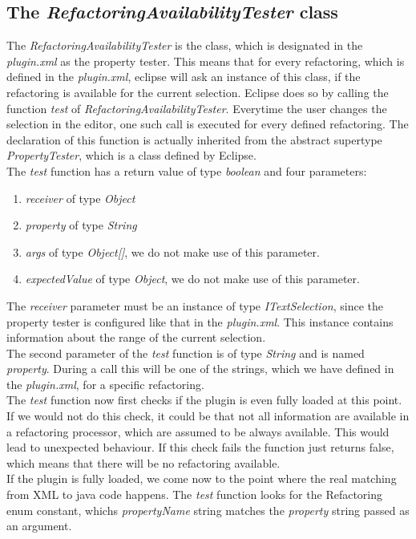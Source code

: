 \documentclass[a4paper,10pt]{report}
\begin{document}
\subsection{The {\it RefactoringAvailabilityTester} class}
The {\it RefactoringAvailabilityTester} is the class, which is designated in the {\it plugin.xml} as the property tester. This means that for every refactoring, which is defined in the {\it plugin.xml},
eclipse will ask an instance of this class, if the refactoring is available for the current selection. Eclipse does so by calling the function {\it test} of {\it RefactoringAvailabilityTester}. 
Everytime the user changes the selection in the editor, one such call is executed for every defined refactoring.
The declaration of this function is actually inherited from the abstract supertype {\it PropertyTester}, which is a class defined by Eclipse.\\
The {\it test} function has a return value of type {\it boolean} and four parameters:
   \begin{enumerate}
     \item {\it receiver} of type {\it Object}
     \item {\it property} of type {\it String}
     \item {\it args}  of type {\it Object[]}, we do not make use of this parameter.
     \item {\it expectedValue}  of type {\it Object}, we do not make use of this parameter.
   \end{enumerate}
The {\it receiver} parameter must be an instance of type {\it ITextSelection}, since the property tester is configured like that in the {\it plugin.xml}. This instance contains information about the range of the current selection.\\
The second parameter of the {\it test} function is of type {\it String} and is named {\it property}. During a call this will be one of the strings, which we have defined in the {\it plugin.xml}, for a specific refactoring.\\
The {\it test} function now first checks if the plugin is even fully loaded at this point. If we would not do this check, it could be that not all information are available in a refactoring processor, which are assumed to be always available. This would lead to unexpected behaviour.
If this check fails the function just returns false, which means  that there will be no refactoring available.\\
If the plugin is fully loaded, we come now to the point where the real matching from XML to java code happens. The {\it test} function looks for the {Refactoring} enum constant, whichs {\it propertyName} string matches the {\it property} string passed as an argument.
\end{document}
